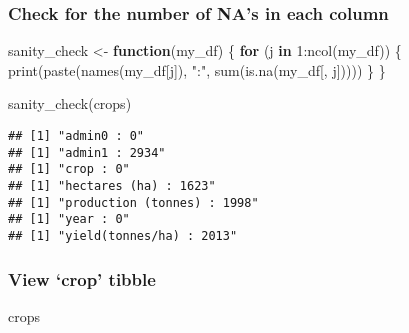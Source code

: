 \documentclass[
]{article}
\newenvironment{Shaded}{\begin{snugshade}}{\end{snugshade}}
\newcommand{\ControlFlowTok}[1]{\textcolor[rgb]{0.13,0.29,0.53}{\textbf{#1}}}
\newcommand{\DecValTok}[1]{\textcolor[rgb]{0.00,0.00,0.81}{#1}}
\newcommand{\FunctionTok}[1]{\textcolor[rgb]{0.00,0.00,0.00}{#1}}
\newcommand{\NormalTok}[1]{#1}
\newcommand{\OtherTok}[1]{\textcolor[rgb]{0.56,0.35,0.01}{#1}}
\newcommand{\SpecialCharTok}[1]{\textcolor[rgb]{0.00,0.00,0.00}{#1}}
\newcommand{\StringTok}[1]{\textcolor[rgb]{0.31,0.60,0.02}{#1}}
\begin{document}
\hypertarget{check-for-the-number-of-nas-in-each-column}{%
\subsubsection{Check for the number of NA's in each
column}\label{check-for-the-number-of-nas-in-each-column}}

\begin{Shaded}
\begin{Highlighting}[]
\NormalTok{sanity\_check }\OtherTok{\textless{}{-}} \ControlFlowTok{function}\NormalTok{(my\_df) \{}
  \ControlFlowTok{for}\NormalTok{ (j }\ControlFlowTok{in} \DecValTok{1}\SpecialCharTok{:}\FunctionTok{ncol}\NormalTok{(my\_df)) \{}
    \FunctionTok{print}\NormalTok{(}\FunctionTok{paste}\NormalTok{(}\FunctionTok{names}\NormalTok{(my\_df[j]), }\StringTok{":"}\NormalTok{, }\FunctionTok{sum}\NormalTok{(}\FunctionTok{is.na}\NormalTok{(my\_df[, j]))))}
\NormalTok{  \}}
\NormalTok{\}}

\FunctionTok{sanity\_check}\NormalTok{(crops)}
\end{Highlighting}
\end{Shaded}

\begin{verbatim}
## [1] "admin0 : 0"
## [1] "admin1 : 2934"
## [1] "crop : 0"
## [1] "hectares (ha) : 1623"
## [1] "production (tonnes) : 1998"
## [1] "year : 0"
## [1] "yield(tonnes/ha) : 2013"
\end{verbatim}

\hypertarget{view-crop-tibble}{%
\subsubsection{View `crop' tibble}\label{view-crop-tibble}}

\begin{Shaded}
\begin{Highlighting}[]
\NormalTok{crops}
\end{Highlighting}
\end{Shaded}
\end{document}
